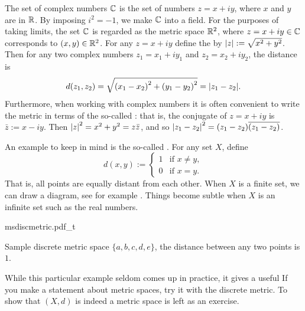 \begin{example}
The set of complex numbers ${\mathbb{C}}$ is the set of numbers $z = x+iy$, where $x$
and $y$ are in ${\mathbb{R}}$.  By imposing $i^2 = -1$, we make ${\mathbb{C}}$ into a
field.
For the purposes of taking limits,
the set ${\mathbb{C}}$ is regarded as the metric space ${\mathbb{R}}^2$, where $z=x+iy \in {\mathbb{C}}$
corresponds to $(x,y) \in {\mathbb{R}}^2$.
For any $z=x+iy$ define the \emph{}
by $\lvert {z} \rvert := \sqrt{x^2+y^2}$.
Then for any two complex numbers
$z_1 = x_1 + iy_1$ and $z_2 = x_2 + iy_2$, the distance is
\begin{equation*}
d(z_1,z_2) = \sqrt{{(x_1-x_2)}^2+ {(y_1-y_2)}^2} = \lvert {z_1-z_2} \rvert.
\end{equation*}
Furthermore, when working with complex numbers
it is often convenient to write the metric in terms of
the so-called
\emph{}: that is, the conjugate of $z=x+iy$
is $\bar{z} := x-iy$.  Then 
${\lvert {z} \rvert}^2 = x^2 +y^2 = z\bar{z}$, and so ${\lvert {z_1-z_2} \rvert}^2 =
(z_1-z_2)\overline{(z_1-z_2)}$.
\end{example}

\begin{example}
An example to keep in mind is the so-called
\emph{}.
For any set $X$, define
\begin{equation*}
d(x,y) :=
\begin{cases}
1 & \text{if } x \not= y, \\
0 & \text{if } x = y.
\end{cases}
\end{equation*}
That is, all points are equally distant from each other.  When $X$ is a
finite set, we can draw a diagram, see for example
.
Things become subtle when $X$ is an infinite set such
as the real numbers.
\begin{myfigureht}
{msdiscmetric.pdf_t}
\caption{Sample discrete metric space $\{ a,b,c,d,e \}$, the distance
between any two points is $1$.\label{fig:msdiscmetric}}
\end{myfigureht}

While this particular
example seldom comes up in practice, it gives a useful 
  If you make a statement about metric spaces,
try it with the discrete metric.
To show that $(X,d)$ is indeed a metric space is left as an exercise.
\end{example}

